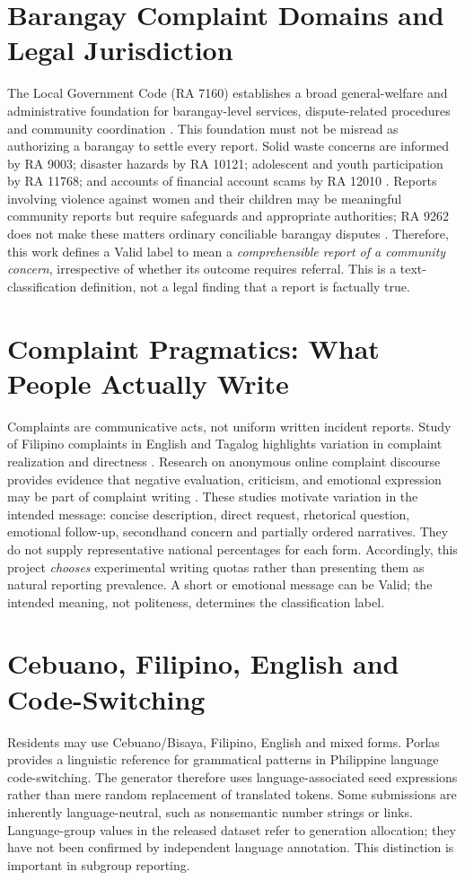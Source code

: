 \section{Barangay Complaint Domains and Legal Jurisdiction}
The Local Government Code (RA 7160) establishes a broad general-welfare and administrative foundation for barangay-level services, dispute-related procedures and community coordination \cite{ra7160}. This foundation must not be misread as authorizing a barangay to settle every report. Solid waste concerns are informed by RA 9003; disaster hazards by RA 10121; adolescent and youth participation by RA 11768; and accounts of financial account scams by RA 12010 \cite{ra9003,ra10121,ra11768,ra12010}. Reports involving violence against women and their children may be meaningful community reports but require safeguards and appropriate authorities; RA 9262 does not make these matters ordinary conciliable barangay disputes \cite{ra9262}. Therefore, this work defines a Valid label to mean a \emph{comprehensible report of a community concern}, irrespective of whether its outcome requires referral. This is a text-classification definition, not a legal finding that a report is factually true.

\section{Complaint Pragmatics: What People Actually Write}
Complaints are communicative acts, not uniform written incident reports. Study of Filipino complaints in English and Tagalog highlights variation in complaint realization and directness \cite{deleon}. Research on anonymous online complaint discourse provides evidence that negative evaluation, criticism, and emotional expression may be part of complaint writing \cite{quimbo}. These studies motivate variation in the intended message: concise description, direct request, rhetorical question, emotional follow-up, secondhand concern and partially ordered narratives. They do not supply representative national percentages for each form. Accordingly, this project \emph{chooses} experimental writing quotas rather than presenting them as natural reporting prevalence. A short or emotional message can be Valid; the intended meaning, not politeness, determines the classification label.

\section{Cebuano, Filipino, English and Code-Switching}
Residents may use Cebuano/Bisaya, Filipino, English and mixed forms. Porlas \cite{porlas} provides a linguistic reference for grammatical patterns in Philippine language code-switching. The generator therefore uses language-associated seed expressions rather than mere random replacement of translated tokens. Some submissions are inherently language-neutral, such as nonsemantic number strings or links. Language-group values in the released dataset refer to generation allocation; they have not been confirmed by independent language annotation. This distinction is important in subgroup reporting.

